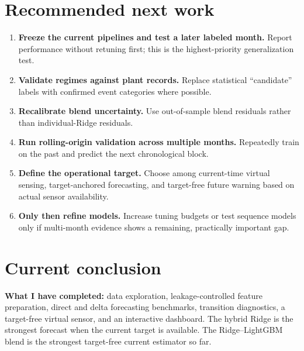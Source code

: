 \documentclass[10pt,a4paper]{article}
\newcommand{\statusbox}[1]{\colorbox{Light}{\parbox{0.96\linewidth}{#1}}}
\begin{document}
\section{Recommended next work}

\begin{enumerate}
  \item \textbf{Freeze the current pipelines and test a later labeled month.} Report performance without retuning first; this is the highest-priority generalization test.
  \item \textbf{Validate regimes against plant records.} Replace statistical ``candidate'' labels with confirmed event categories where possible.
  \item \textbf{Recalibrate blend uncertainty.} Use out-of-sample blend residuals rather than individual-Ridge residuals.
  \item \textbf{Run rolling-origin validation across multiple months.} Repeatedly train on the past and predict the next chronological block.
  \item \textbf{Define the operational target.} Choose among current-time virtual sensing, target-anchored forecasting, and target-free future warning based on actual sensor availability.
  \item \textbf{Only then refine models.} Increase tuning budgets or test sequence models only if multi-month evidence shows a remaining, practically important gap.
\end{enumerate}

\section*{Current conclusion}

\statusbox{\textbf{What I have completed:} data exploration, leakage-controlled feature preparation, direct and delta forecasting benchmarks, transition diagnostics, a target-free virtual sensor, and an interactive dashboard. The hybrid Ridge is the strongest forecast when the current target is available. The Ridge--LightGBM blend is the strongest target-free current estimator so far.}
\end{document}
